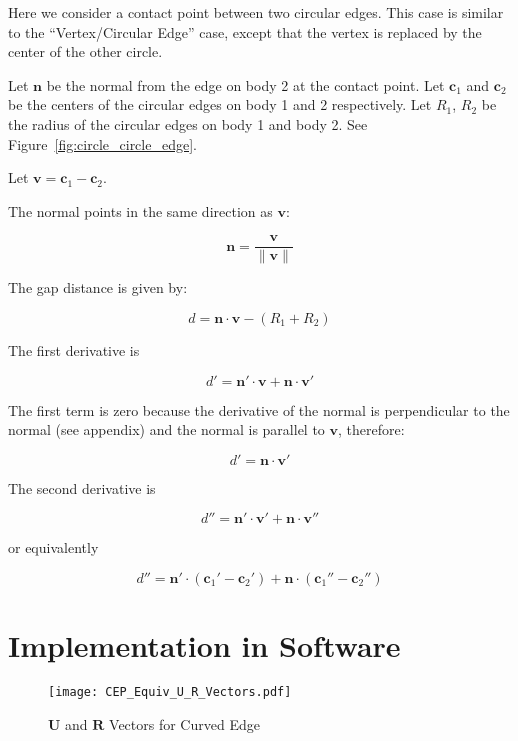 \documentclass[final]{article}
\begin{document}
Here we consider a contact point between two circular edges. This case is similar to the
``Vertex/Circular Edge'' case, except that the vertex is replaced by the center of the
other circle.

Let $\mathbf{n}$ be the normal from the edge on body 2 at the contact point. Let
$\mathbf{c}_1$ and $\mathbf{c}_2$ be the centers of the circular edges on body 1 and 2
respectively. Let $R_1$, $R_2$ be the radius of the circular edges on body 1 and body 2.
See Figure~\ref{fig:circle_circle_edge}.


Let $\mathbf{v} = \mathbf{c}_1 - \mathbf{c}_2$.

The normal points in the same direction as $\mathbf{v}$:

\[
  \mathbf{n} = \frac { \mathbf{v} } { \|\mathbf{v}\| }
\]

The gap distance is given by:

\[
  d = \mathbf{n} \cdot \mathbf{v} - (R_1 + R_2)
\]

The first derivative is

\[
  d' = \mathbf{n}' \cdot \mathbf{v} + \mathbf{n} \cdot \mathbf{v}'
\]

The first term is zero because the derivative of the normal is perpendicular to the
normal (see appendix) and the normal is parallel to $\mathbf{v}$, therefore:

\[
  d' = \mathbf{n} \cdot \mathbf{v}'
\]

The second derivative is

\[
  d'' = \mathbf{n}' \cdot \mathbf{v}' + \mathbf{n} \cdot \mathbf{v}''
\]

or equivalently

\begin{equation}\label{accel_circle_circle}
  d'' = \mathbf{n}' \cdot (\mathbf{c}_1' - \mathbf{c}_2')
    + \mathbf{n} \cdot (\mathbf{c}_1'' - \mathbf{c}_2'')
\end{equation}



\section{Implementation in Software}

\begin{figure}[ht]
    \centering
    \texttt{[image: CEP\_Equiv\_U\_R\_Vectors.pdf]}
    \caption{$\mathbf{U}$ and $\mathbf{R}$ Vectors for Curved Edge}
    \label{fig:CEP_Equiv_U_R_Vectors}
\end{figure}
\end{document}
